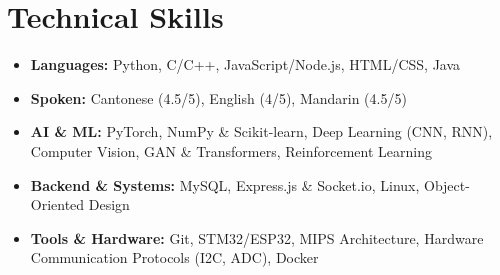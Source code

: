 \documentclass[a4paper,10pt]{article}
\begin{document}
\section{Technical Skills}
\begin{itemize}[leftmargin=*, label={}, itemsep=1pt]
    \item \textbf{Languages:} Python, C/C++, JavaScript/Node.js, HTML/CSS, Java
    \item \textbf{Spoken:} Cantonese (4.5/5), English (4/5), Mandarin (4.5/5)
    \item \textbf{AI \& ML:} PyTorch, NumPy \& Scikit-learn, Deep Learning (CNN, RNN), Computer Vision, GAN \& Transformers, Reinforcement Learning
    \item \textbf{Backend \& Systems:} MySQL, Express.js \& Socket.io, Linux, Object-Oriented Design
    \item \textbf{Tools \& Hardware:} Git, STM32/ESP32, MIPS Architecture, Hardware Communication Protocols (I2C, ADC), Docker
\end{itemize}
\end{document}
